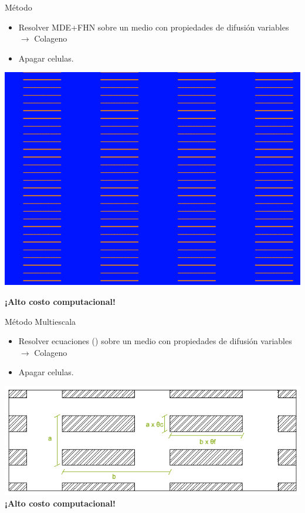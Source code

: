 \documentclass[11pt,spanish]{beamer}
\begin{document}
\begin{frame}{Método}
\begin{itemize}
\item Resolver MDE+FHN sobre un medio con propiedades de difusión variables \pause $\rightarrow$ Colageno
\item \pause Apagar celulas.
\end{itemize}
\centering
\includegraphics[height = 4 cm]{fig/theorem_verification_r2-laminations} 

\pause
\textbf{¡Alto costo computacional!}

\end{frame}

\begin{frame}
\begin{center}
\Huge Método Multiescala
\end{center}
\end{frame}

\begin{frame}
\begin{itemize}
\item Resolver ecuaciones (\label{modelo_final}) sobre un medio con propiedades de difusión variables $\rightarrow$ Colageno
\item  Apagar celulas.
\end{itemize}
\centering
\includegraphics[height = 4 cm]{fig/theorem_verification_r2-geometry_convention.png} \\
\textbf{¡Alto costo computacional!}

\end{frame}
\end{document}
